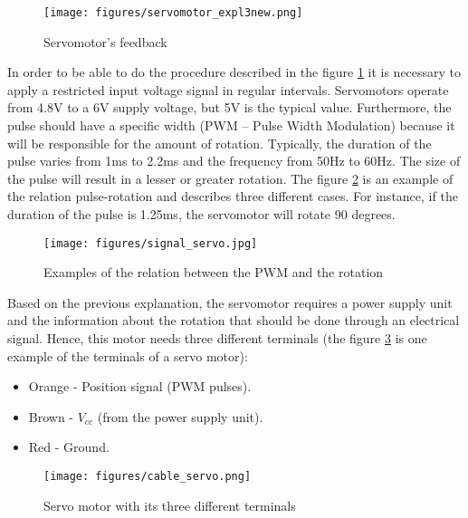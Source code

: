 \begin{figure}[H]
\centerline{
\texttt{[image: figures/servomotor\_expl3new.png]}}
\caption{Servomotor’s feedback}
\label{servomotor_expl3}
\end{figure}

In order to be able to do the procedure described in the figure \ref{servomotor_expl3} it is necessary to apply a restricted input voltage signal in regular intervals. Servomotors operate from 4.8V to a 6V supply voltage, but 5V is the typical value. Furthermore, the pulse should have a specific width (PWM – Pulse Width Modulation) because it will be responsible for the amount of rotation. Typically, the duration of the pulse varies from 1ms to 2.2ms and the frequency from 50Hz to 60Hz. The size of the pulse will result in a lesser or greater rotation. The figure \ref{signal_servo} is an example of the relation pulse-rotation and describes three different cases. For instance, if the duration of the pulse is 1.25ms, the servomotor will rotate 90 degrees.

\begin{figure}[H]
\centering
\texttt{[image: figures/signal\_servo.jpg]}
\caption{Examples of the relation between the PWM and the rotation}
\label{signal_servo}
\end{figure}

Based on the previous explanation, the servomotor requires a power supply unit and the information about the rotation that should be done through an electrical signal. Hence, this motor needs three different terminals (the figure \ref{cable_servo} is one example of the terminals of a servo motor):
\begin{itemize}  
        \item Orange - Position signal (PWM pulses).
        \item Brown - $V_{cc}$ (from the power supply unit). 
        \item Red - Ground.
\end{itemize}

\begin{figure}[H]
\centering
\texttt{[image: figures/cable\_servo.png]}
\caption{Servo motor with its three different terminals}
\label{cable_servo}
\end{figure}

